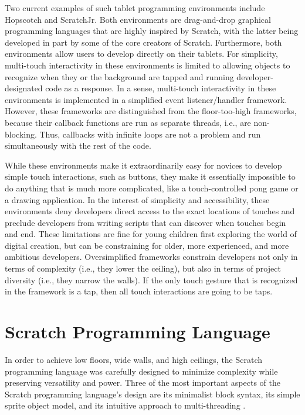 Two current examples of such tablet programming environments include Hopscotch\cite{Hopscotch} and ScratchJr\cite{ScratchJr}. Both environments are drag-and-drop graphical programming languages that are highly inspired by Scratch, with the latter being developed in part by some of the core creators of Scratch. Furthermore, both environments allow users to develop directly on their tablets. For simplicity, multi-touch interactivity in these environments is limited to allowing objects to recognize when they or the background are tapped and running developer-designated code as a response. In a sense, multi-touch interactivity in these environments is implemented in a simplified event listener/handler framework. However, these frameworks are distinguished from the floor-too-high frameworks, because their callback functions are run as separate threads, i.e., are non-blocking. Thus, callbacks with infinite loops are not a problem and run simultaneously with the rest of the code.

While these environments make it extraordinarily easy for novices to develop simple touch interactions, such as buttons, they make it essentially impossible to do anything that is much more complicated, like a touch-controlled pong game or a drawing application. In the interest of simplicity and accessibility, these environments deny developers direct access to the exact locations of touches and preclude developers from writing scripts that can discover when touches begin and end. These limitations are fine for young children first exploring the world of digital creation, but can be constraining for older, more experienced, and more ambitious developers. Oversimplified frameworks constrain developers not only in terms of complexity (i.e., they lower the ceiling), but also in terms of project diversity (i.e., they narrow the walls). If the only touch gesture that is recognized in the framework is a tap, then all touch interactions are going to be taps.

\section{Scratch Programming Language}

In order to achieve low floors, wide walls, and high ceilings, the Scratch programming language was carefully designed to minimize complexity while preserving versatility and power. Three of the most important aspects of the Scratch programming language's design are its minimalist block syntax, its simple sprite object model, and its intuitive approach to multi-threading \cite{Maloney}.


